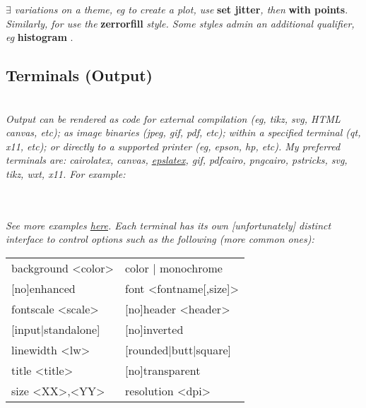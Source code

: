 \textit{$\exists$ variations on a theme, eg to create a  plot, use }\textbf{set jitter}\textit{, then }\textbf{with points}.\textit{ Similarly, for  use the }\textbf{zerrorfill}\textit{ style. Some styles admin an additional qualifier, eg }\textbf{histogram }.\\


\subsection*{Terminals (Output)}

\\

\textit{Output can be rendered as code for external compilation (eg, tikz, svg, HTML canvas, etc); as image binaries (jpeg, gif, pdf, etc); within a specified terminal (qt, x11, etc); or directly to a supported printer (eg, epson, hp, etc). My preferred terminals are: cairolatex, canvas, \href{http://gnuplot.sourceforge.net/docs/tutorial.pdf}{epslatex}, gif, pdfcairo, pngcairo, pstricks, svg, tikz, wxt, x11. For example:}

\\
\\

\textit{See more examples \href{http://www.gnuplotting.org/output-terminals/}{here}. Each terminal has its own [unfortunately] distinct interface to control options such as the following (more common ones):}\\
{\footnotesize
\begin{tabular}{l l}
background <color>  & color | monochrome \\
{[no]}enhanced      &  font <fontname[,size]> \\
fontscale <scale>   &  {[no]}header <header> \\
{[input|standalone]}&  {[no]}inverted \\
linewidth <lw>      &  {[rounded|butt|square]} \\
title <title>       &  {[no]}transparent \\
size <XX>,<YY>      &  resolution <dpi> \\
\end{tabular}
}

